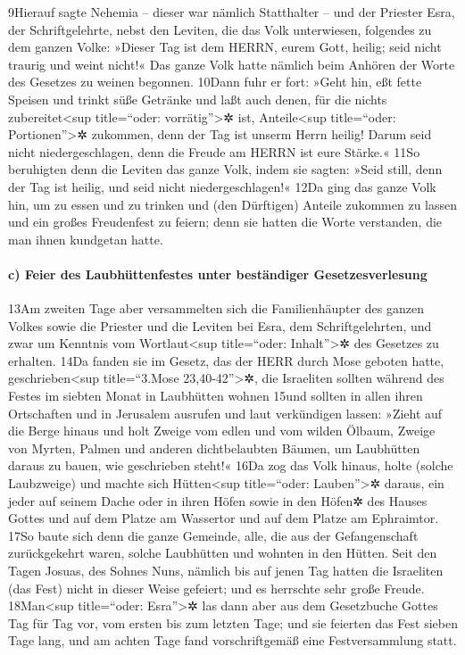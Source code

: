 9Hierauf sagte Nehemia -- dieser war nämlich Statthalter -- und der
Priester Esra, der Schriftgelehrte, nebst den Leviten, die das Volk
unterwiesen, folgendes zu dem ganzen Volke: »Dieser Tag ist dem HERRN,
eurem Gott, heilig; seid nicht traurig und weint nicht!« Das ganze Volk
hatte nämlich beim Anhören der Worte des Gesetzes zu weinen begonnen.
10Dann fuhr er fort: »Geht hin, eßt fette Speisen und trinkt süße
Getränke und laßt auch denen, für die nichts zubereitet\textless sup
title=``oder: vorrätig''\textgreater✲ ist, Anteile\textless sup
title=``oder: Portionen''\textgreater✲ zukommen, denn der Tag ist unserm
Herrn heilig! Darum seid nicht niedergeschlagen, denn die Freude am
HERRN ist eure Stärke.« 11So beruhigten denn die Leviten das ganze Volk,
indem sie sagten: »Seid still, denn der Tag ist heilig, und seid nicht
niedergeschlagen!« 12Da ging das ganze Volk hin, um zu essen und zu
trinken und (den Dürftigen) Anteile zukommen zu lassen und ein großes
Freudenfest zu feiern; denn sie hatten die Worte verstanden, die man
ihnen kundgetan hatte.

\hypertarget{c-feier-des-laubhuxfcttenfestes-unter-bestuxe4ndiger-gesetzesverlesung}{%
\paragraph{c) Feier des Laubhüttenfestes unter beständiger
Gesetzesverlesung}\label{c-feier-des-laubhuxfcttenfestes-unter-bestuxe4ndiger-gesetzesverlesung}}

13Am zweiten Tage aber versammelten sich die Familienhäupter des ganzen
Volkes sowie die Priester und die Leviten bei Esra, dem
Schriftgelehrten, und zwar um Kenntnis vom Wortlaut\textless sup
title=``oder: Inhalt''\textgreater✲ des Gesetzes zu erhalten. 14Da
fanden sie im Gesetz, das der HERR durch Mose geboten hatte,
geschrieben\textless sup title=``3.Mose 23,40-42''\textgreater✲, die
Israeliten sollten während des Festes im siebten Monat in Laubhütten
wohnen 15und sollten in allen ihren Ortschaften und in Jerusalem
ausrufen und laut verkündigen lassen: »Zieht auf die Berge hinaus und
holt Zweige vom edlen und vom wilden Ölbaum, Zweige von Myrten, Palmen
und anderen dichtbelaubten Bäumen, um Laubhütten daraus zu bauen, wie
geschrieben steht!« 16Da zog das Volk hinaus, holte (solche Laubzweige)
und machte sich Hütten\textless sup title=``oder: Lauben''\textgreater✲
daraus, ein jeder auf seinem Dache oder in ihren Höfen sowie in den
Höfen✲ des Hauses Gottes und auf dem Platze am Wassertor und auf dem
Platze am Ephraimtor. 17So baute sich denn die ganze Gemeinde, alle, die
aus der Gefangenschaft zurückgekehrt waren, solche Laubhütten und
wohnten in den Hütten. Seit den Tagen Josuas, des Sohnes Nuns, nämlich
bis auf jenen Tag hatten die Israeliten (das Fest) nicht in dieser Weise
gefeiert; und es herrschte sehr große Freude. 18Man\textless sup
title=``oder: Esra''\textgreater✲ las dann aber aus dem Gesetzbuche
Gottes Tag für Tag vor, vom ersten bis zum letzten Tage; und sie
feierten das Fest sieben Tage lang, und am achten Tage fand
vorschriftgemäß eine Festversammlung statt.

